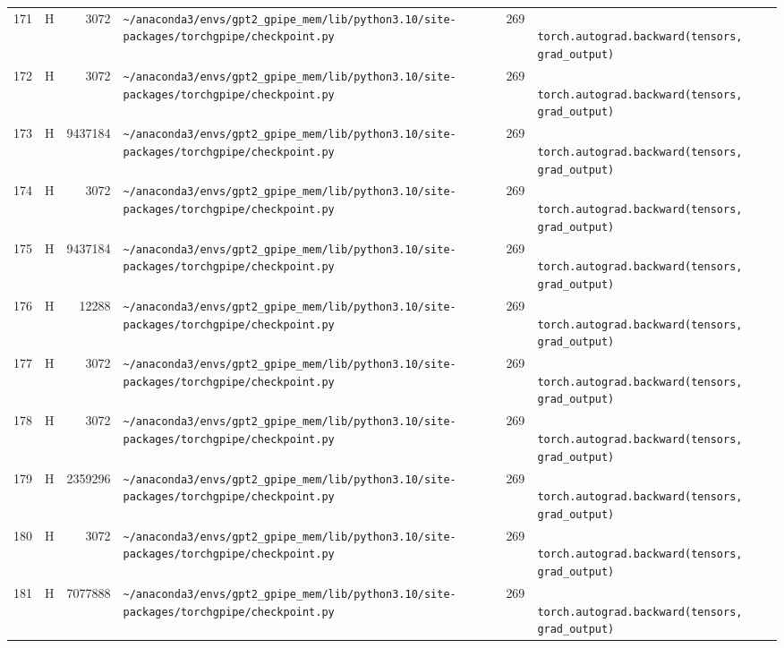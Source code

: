 \documentclass{article}
\begin{document}
\begin{longtable}{r l r p{6.5cm} r p{7.0cm}}
171 & H & 3072 & \lstinline|~/anaconda3/envs/gpt2_gpipe_mem/lib/python3.10/site-packages/torchgpipe/checkpoint.py| & 269 & \lstinline|            torch.autograd.backward(tensors, grad_output)| \\
172 & H & 3072 & \lstinline|~/anaconda3/envs/gpt2_gpipe_mem/lib/python3.10/site-packages/torchgpipe/checkpoint.py| & 269 & \lstinline|            torch.autograd.backward(tensors, grad_output)| \\
173 & H & 9437184 & \lstinline|~/anaconda3/envs/gpt2_gpipe_mem/lib/python3.10/site-packages/torchgpipe/checkpoint.py| & 269 & \lstinline|            torch.autograd.backward(tensors, grad_output)| \\
174 & H & 3072 & \lstinline|~/anaconda3/envs/gpt2_gpipe_mem/lib/python3.10/site-packages/torchgpipe/checkpoint.py| & 269 & \lstinline|            torch.autograd.backward(tensors, grad_output)| \\
175 & H & 9437184 & \lstinline|~/anaconda3/envs/gpt2_gpipe_mem/lib/python3.10/site-packages/torchgpipe/checkpoint.py| & 269 & \lstinline|            torch.autograd.backward(tensors, grad_output)| \\
176 & H & 12288 & \lstinline|~/anaconda3/envs/gpt2_gpipe_mem/lib/python3.10/site-packages/torchgpipe/checkpoint.py| & 269 & \lstinline|            torch.autograd.backward(tensors, grad_output)| \\
177 & H & 3072 & \lstinline|~/anaconda3/envs/gpt2_gpipe_mem/lib/python3.10/site-packages/torchgpipe/checkpoint.py| & 269 & \lstinline|            torch.autograd.backward(tensors, grad_output)| \\
178 & H & 3072 & \lstinline|~/anaconda3/envs/gpt2_gpipe_mem/lib/python3.10/site-packages/torchgpipe/checkpoint.py| & 269 & \lstinline|            torch.autograd.backward(tensors, grad_output)| \\
179 & H & 2359296 & \lstinline|~/anaconda3/envs/gpt2_gpipe_mem/lib/python3.10/site-packages/torchgpipe/checkpoint.py| & 269 & \lstinline|            torch.autograd.backward(tensors, grad_output)| \\
180 & H & 3072 & \lstinline|~/anaconda3/envs/gpt2_gpipe_mem/lib/python3.10/site-packages/torchgpipe/checkpoint.py| & 269 & \lstinline|            torch.autograd.backward(tensors, grad_output)| \\
181 & H & 7077888 & \lstinline|~/anaconda3/envs/gpt2_gpipe_mem/lib/python3.10/site-packages/torchgpipe/checkpoint.py| & 269 & \lstinline|            torch.autograd.backward(tensors, grad_output)| \\

\end{longtable}
\end{document}
